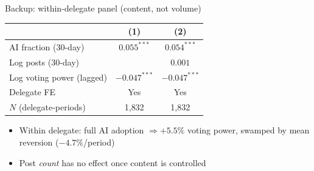 \documentclass[11pt,aspectratio=169]{beamer}
\begin{document}
\begin{frame}[noframenumbering,label=apppanel]{Backup: within-delegate panel (content, not volume)}
  \centering
  \begin{tabular}{lcc}
    \toprule
     & (1) & (2) \\
    \midrule
    AI fraction (30-day)        & $0.055^{***}$ & $0.054^{***}$ \\
    Log posts (30-day)          &               & $0.001$ \\
    Log voting power (lagged)   & $-0.047^{***}$ & $-0.047^{***}$ \\
    \midrule
    Delegate FE                 & Yes & Yes \\
    $N$ (delegate-periods)      & 1{,}832 & 1{,}832 \\
    \bottomrule
  \end{tabular}
  \vspace{0.5em}
  \begin{itemize}
    \setlength{\itemsep}{0.35em}
    \item Within delegate: full AI adoption $\Rightarrow +5.5\%$ voting power, swamped
      by mean reversion ($-4.7\%$/period)
    \item Post \emph{count} has no effect once content is controlled
  \end{itemize}
\end{frame}
\end{document}

